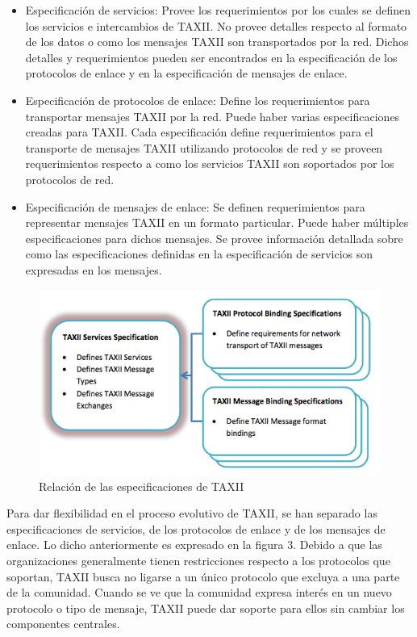 \begin{itemize}
  \item Especificación de servicios: Provee los requerimientos por los cuales se 
  definen los servicios e intercambios de TAXII. No provee detalles respecto al 
  formato de los datos o como los mensajes TAXII son transportados por la red. 
  Dichos detalles y requerimientos pueden ser encontrados en la especificación 
  de los protocolos de enlace y en la especificación de mensajes de enlace.
 \item Especificación de protocolos de enlace: Define los requerimientos para 
 transportar mensajes TAXII por la red. Puede haber varias especificaciones 
 creadas para TAXII. Cada especificación define requerimientos para el 
 transporte de mensajes TAXII utilizando protocolos de red y se proveen 
 requerimientos respecto a como los servicios TAXII son soportados por los 
 protocolos de red.
 \item Especificación de mensajes de enlace: Se definen requerimientos para 
 representar mensajes TAXII en un formato particular. Puede haber múltiples 
 especificaciones para dichos mensajes. Se provee información detallada sobre 
 como las especificaciones definidas en la especificación de servicios son 
 expresadas en los mensajes.
\end{itemize}

\begin{figure}[ht!]
  \centering
    \includegraphics[width=150mm]{./images/TAXIIEspecification.png}
    \caption{Relación de las especificaciones de TAXII \protect\cite{b1}}
\end{figure}

Para dar flexibilidad en el proceso evolutivo de TAXII, se han separado las 
especificaciones de servicios, de los protocolos de enlace y de los mensajes de 
enlace. Lo dicho anteriormente es expresado en la figura 3.
Debido a que las organizaciones generalmente tienen restricciones 
respecto a los protocolos que soportan, TAXII busca no ligarse a un único 
protocolo que excluya a una parte de la comunidad. Cuando se ve que la comunidad 
expresa interés en un nuevo protocolo o tipo de mensaje, TAXII puede dar soporte 
para ellos sin cambiar los componentes centrales.

